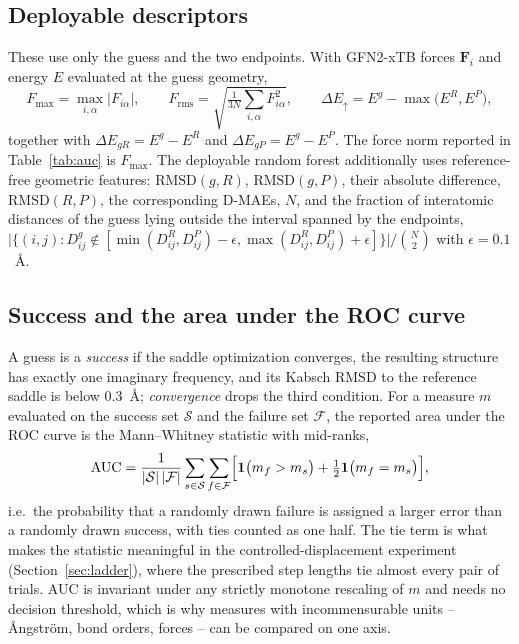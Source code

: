 \documentclass[11pt]{article}
\begin{document}
\subsection{Deployable descriptors}
These use only the guess and the two endpoints. With GFN2-xTB forces
$\mathbf{F}_i$ and energy $E$ evaluated at the guess geometry,
\begin{equation}
F_{\max} = \max_{i,\alpha}\lvert F_{i\alpha}\rvert,
\qquad
F_{\mathrm{rms}} = \sqrt{\tfrac{1}{3N}\textstyle\sum_{i,\alpha}F_{i\alpha}^{2}},
\qquad
\Delta E_{\uparrow} = E^{g}-\max\bigl(E^{R},E^{P}\bigr),
\end{equation}
together with $\Delta E_{gR}=E^{g}-E^{R}$ and $\Delta E_{gP}=E^{g}-E^{P}$. The
force norm reported in Table~\ref{tab:auc} is $F_{\max}$. The deployable random
forest additionally uses reference-free geometric features: $\text{RMSD}(g,R)$,
$\text{RMSD}(g,P)$, their absolute difference, $\text{RMSD}(R,P)$, the
corresponding D-MAEs, $N$, and the fraction of interatomic distances of the guess
lying outside the interval spanned by the endpoints,
$\lvert\{(i,j): D^{g}_{ij}\notin[\min(D^{R}_{ij},D^{P}_{ij})-\epsilon,
\max(D^{R}_{ij},D^{P}_{ij})+\epsilon]\}\rvert / \binom{N}{2}$ with
$\epsilon=0.1$~\AA.

\subsection{Success and the area under the ROC curve}
A guess is a \textit{success} if the saddle optimization converges, the resulting
structure has exactly one imaginary frequency, and its Kabsch RMSD to the
reference saddle is below $0.3$~\AA; \textit{convergence} drops the third
condition. For a measure $m$ evaluated on the success set $\mathcal{S}$ and the
failure set $\mathcal{F}$, the reported area under the ROC curve is the
Mann--Whitney statistic with mid-ranks,
\begin{equation}
\mathrm{AUC} = \frac{1}{\lvert\mathcal{S}\rvert\,\lvert\mathcal{F}\rvert}
\sum_{s\in\mathcal{S}}\sum_{f\in\mathcal{F}}
\Bigl[\mathbf{1}\bigl(m_f>m_s\bigr)+\tfrac{1}{2}\mathbf{1}\bigl(m_f=m_s\bigr)\Bigr],
\end{equation}
i.e.\ the probability that a randomly drawn failure is assigned a larger error
than a randomly drawn success, with ties counted as one half. The tie term is
what makes the statistic meaningful in the controlled-displacement experiment
(Section~\ref{sec:ladder}), where the prescribed step lengths tie almost every
pair of trials. AUC is invariant under any strictly monotone rescaling of $m$ and
needs no decision threshold, which is why measures with incommensurable units --
\AA ngstr\"om, bond orders, forces -- can be compared on one axis.



\end{document}
